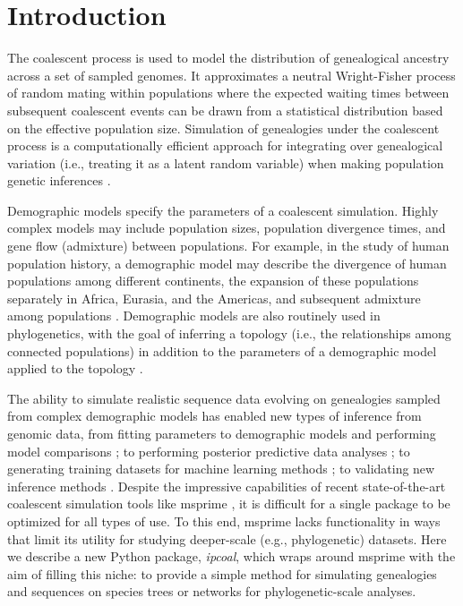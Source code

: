 \documentclass[11pt]{article}
\begin{document}
\RaggedRight
\bigskip

\section{Introduction}
The coalescent process \citep{kingman_coalescent_1982,hudson_testing_1983} is used to model the distribution of genealogical ancestry across a set of sampled genomes. It approximates a neutral Wright-Fisher process of random mating within populations where the expected waiting times between subsequent coalescent events can be drawn from a statistical distribution based on the effective population size. Simulation of genealogies under the coalescent process \citep{hudson_generating_2002} is a computationally efficient approach for integrating over genealogical variation (i.e., treating it as a latent random variable) when making population genetic inferences \citep{beerli_coalescent_2001}. 

Demographic models specify the parameters of a coalescent simulation. Highly complex models may include population sizes, population divergence times, and gene flow (admixture) between populations. For example, in the study of human population history, a demographic model may describe the divergence of human populations among different continents, the expansion of these populations separately in Africa, Eurasia, and the Americas, and subsequent admixture among populations \citep{reich_who_2018,green_neandertal_2010,gronau_demography_2011}. Demographic models are also routinely used in phylogenetics, with the goal of inferring a topology (i.e., the relationships among connected populations) in addition to the parameters of a demographic model applied to the topology \citep{degnan_gene_2009,knowles_estimating_2011}. 

The ability to simulate realistic sequence data evolving on genealogies sampled from complex demographic models has enabled new types of inference from genomic data, from fitting parameters to demographic models and performing model comparisons \citep{chung_bayesian_2017}; to performing posterior predictive data analyses \citep{brown_predictive_2014}; to generating training datasets for machine learning methods \citep{schrider_learning_2017}; to validating new inference methods \citep{adrion_community_maintained_2019}. Despite the impressive capabilities of recent state-of-the-art coalescent simulation tools like msprime \citep{kelleher_efficient_2016}, it is difficult for a single package to be optimized for all types of use. To this end, msprime lacks functionality in ways that limit its utility for studying deeper-scale (e.g., phylogenetic) datasets. Here we describe a new Python package, \emph{ipcoal}, which wraps around msprime with the aim of filling this niche: to provide a simple method for simulating genealogies and sequences on species trees or networks for phylogenetic-scale analyses.
\end{document}
